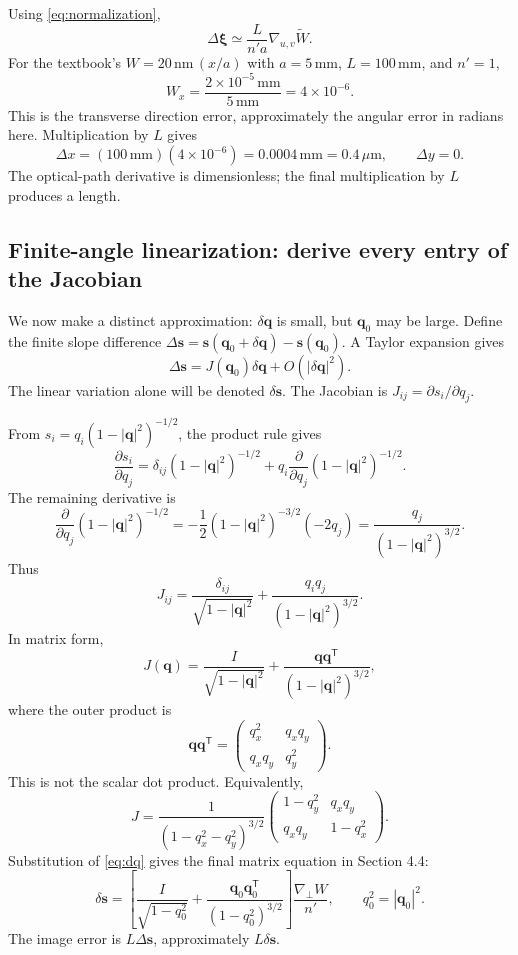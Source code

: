 \documentclass[11pt,a4paper]{article}
\numberwithin{equation}{section}
\newcommand{\gradp}{\nabla_{\!\perp}}
\newcommand{\vct}[1]{\bm{#1}}
\newcommand{\mm}{\,\mathrm{mm}}
\newcommand{\nm}{\,\mathrm{nm}}
\newcommand{\um}{\,\mu\mathrm{m}}
\begin{document}
Using \eqref{eq:normalization},
\begin{equation}
 \boxed{
 \Delta\vct\xi\simeq\frac{L}{n'a}\nabla_{u,v}\widetilde W.
 }
\end{equation}
For the textbook's $W=20\nm\,(x/a)$ with $a=5\mm$, $L=100\mm$,
and $n'=1$,
\[
 W_x=\frac{2\times10^{-5}\mm}{5\mm}=4\times10^{-6}.
\]
This is the transverse direction error, approximately the angular error in
radians here. Multiplication by $L$ gives
\[
 \Delta x=(100\mm)(4\times10^{-6})=0.0004\mm=0.4\um,\qquad
 \Delta y=0.
\]
The optical-path derivative is dimensionless; the final multiplication
by $L$ produces a length.

\subsection{Finite-angle linearization: derive every entry of the Jacobian}
We now make a distinct approximation: $\delta\vct q$ is small, but
$\vct q_0$ may be large. Define the finite slope difference
$\Delta\vct s=\vct s(\vct q_0+\delta\vct q)-\vct s(\vct q_0)$.
A Taylor expansion gives
\begin{equation}
 \Delta\vct s=J(\vct q_0)\delta\vct q+O(|\delta\vct q|^2).
 \label{eq:linearization}
\end{equation}
The linear variation alone will be denoted $\delta\vct s$.
The Jacobian is $J_{ij}=\partial s_i/\partial q_j$.

From $s_i=q_i(1-|\vct q|^2)^{-1/2}$, the product rule gives
\[
 \frac{\partial s_i}{\partial q_j}
 =\delta_{ij}(1-|\vct q|^2)^{-1/2}
 +q_i\frac{\partial}{\partial q_j}(1-|\vct q|^2)^{-1/2}.
\]
The remaining derivative is
\[
 \frac{\partial}{\partial q_j}(1-|\vct q|^2)^{-1/2}
 =-\frac12(1-|\vct q|^2)^{-3/2}(-2q_j)
 =\frac{q_j}{(1-|\vct q|^2)^{3/2}}.
\]
Thus
\begin{equation}
 \boxed{
 J_{ij}=\frac{\delta_{ij}}{\sqrt{1-|\vct q|^2}}
 +\frac{q_iq_j}{(1-|\vct q|^2)^{3/2}}.
 }
\end{equation}
In matrix form,
\begin{equation}
 \boxed{
 J(\vct q)=\frac{I}{\sqrt{1-|\vct q|^2}}
 +\frac{\vct q\vct q^{\mathsf T}}{(1-|\vct q|^2)^{3/2}},
 }
 \label{eq:jacobian}
\end{equation}
where the outer product is
\[
 \vct q\vct q^{\mathsf T}
 =\begin{pmatrix}q_x^2&q_xq_y\\q_xq_y&q_y^2\end{pmatrix}.
\]
This is not the scalar dot product. Equivalently,
\[
 J=\frac1{(1-q_x^2-q_y^2)^{3/2}}
 \begin{pmatrix}
 1-q_y^2&q_xq_y\\q_xq_y&1-q_x^2
 \end{pmatrix}.
\]
Substitution of \eqref{eq:dq} gives the final matrix equation in Section 4.4:
\begin{equation}
 \boxed{
 \delta\vct s
 =
 \left[
 \frac{I}{\sqrt{1-q_0^2}}
 +\frac{\vct q_0\vct q_0^{\mathsf T}}{(1-q_0^2)^{3/2}}
 \right]\frac{\gradp W}{n'},
 \qquad q_0^2=|\vct q_0|^2.
 }
 \label{eq:ds-jac}
\end{equation}
The image error is $L\Delta\vct s$, approximately $L\delta\vct s$.
\end{document}
